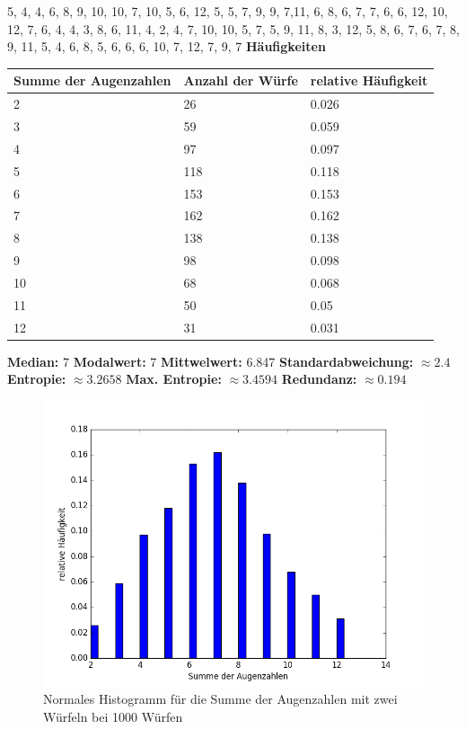 5, 4, 4, 6, 8, 9, 10, 10, 7, 10, 5, 6, 12, 5, 5, 7, 9, 9, 7,11, 6, 8, 6, 7, 7, 6, 6, 12, 10, 12, 7, 6, 4, 4, 3, 8, 6, 11, 4, 2, 4, 7, 10, 10, 5, 7, 5, 9, 11, 8, 3, 12, 5, 8, 6, 7, 6, 7, 8, 9, 11, 5, 4, 6, 8, 5, 6, 6, 6, 10, 7, 12, 7, 9, 7 \newline
\textbf{Häufigkeiten}
\begin{center}
	\begin{tabular}{ | l | l | l | }
		\hline
		Summe der Augenzahlen & Anzahl der Würfe & relative Häufigkeit \\ \hline
		2 & 26 & 0.026 \\ \hline
		3 & 59 & 0.059 \\ \hline
		4 & 97 & 0.097 \\ \hline
		5 & 118 & 0.118 \\ \hline
		6 & 153 & 0.153 \\ \hline
		7 & 162 & 0.162 \\ \hline
		8 & 138 & 0.138 \\ \hline
		9 & 98 & 0.098 \\ \hline
		10 & 68 & 0.068 \\ \hline
		11 & 50 & 0.05 \\ \hline
		12 & 31 & 0.031 \\ \hline
	\end{tabular}  
\end{center}
\textbf{Median:} 7 \newline
\textbf{Modalwert:} 7 \newline
\textbf{Mittwelwert:} 6.847 \newline
\textbf{Standardabweichung:} $\approx 2.4$ \newline
\textbf{Entropie:} $\approx 3.2658$ \newline
\textbf{Max. Entropie:} $\approx 3.4594$ \newline
\textbf{Redundanz:} $\approx 0.194$ \newline
\begin{figure}
	\includegraphics[width=1.0\textwidth]{A04_histo1.png}
	\caption{Normales Histogramm für die Summe der Augenzahlen mit zwei Würfeln bei 1000 Würfen}
\end{figure}

